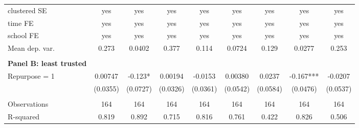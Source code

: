 \documentclass[12pt]{article}
\theoremstyle{plain}
\theoremstyle{plain}
\theoremstyle{plain}
\theoremstyle{definition}
\theoremstyle{plain}
\theoremstyle{definition}
\theoremstyle{plain}
\theoremstyle{remark}
\theoremstyle{definition}
\theoremstyle{definition}
\theoremstyle{plain}
\begin{document}
\begin{table}[H]
{\begin{tabular}{p{9.89em}llllllll}
	\multicolumn{1}{l}{clustered SE} & \multicolumn{1}{c}{yes} & \multicolumn{1}{c}{yes} & \multicolumn{1}{c}{yes} & \multicolumn{1}{c}{yes} & \multicolumn{1}{c}{yes} & \multicolumn{1}{c}{yes} & \multicolumn{1}{c}{yes} & \multicolumn{1}{c}{yes} \\
	\multicolumn{1}{l}{time FE} & \multicolumn{1}{c}{yes} & \multicolumn{1}{c}{yes} & \multicolumn{1}{c}{yes} & \multicolumn{1}{c}{yes} & \multicolumn{1}{c}{yes} & \multicolumn{1}{c}{yes} & \multicolumn{1}{c}{yes} & \multicolumn{1}{c}{yes} \\
	\multicolumn{1}{l}{school FE} & \multicolumn{1}{c}{yes} & \multicolumn{1}{c}{yes} & \multicolumn{1}{c}{yes} & \multicolumn{1}{c}{yes} & \multicolumn{1}{c}{yes} & \multicolumn{1}{c}{yes} & \multicolumn{1}{c}{yes} & \multicolumn{1}{c}{yes} \\
	\multicolumn{1}{l}{Mean dep. var.} & \multicolumn{1}{c}{0.273} & \multicolumn{1}{c}{0.0402} & \multicolumn{1}{c}{0.377} & \multicolumn{1}{c}{0.114} & \multicolumn{1}{c}{0.0724} & \multicolumn{1}{c}{0.129} & \multicolumn{1}{c}{0.0277} & \multicolumn{1}{c}{0.253} \\
	\midrule
	\multicolumn{1}{r}{} &       &       &       &       &       &       &       &  \\
	\multicolumn{1}{l}{\textbf{Panel B: least trusted}} &       &       &       &       &       &       &       &  \\
	\multicolumn{1}{l}{Repurpose = 1} & \multicolumn{1}{c}{0.00747} & \multicolumn{1}{c}{-0.123*} & \multicolumn{1}{c}{0.00194} & \multicolumn{1}{c}{-0.0153} & \multicolumn{1}{c}{0.00380} & \multicolumn{1}{c}{0.0237} & \multicolumn{1}{c}{-0.167***} & \multicolumn{1}{c}{-0.0207} \\
	\multicolumn{1}{l}{} & \multicolumn{1}{c}{(0.0355)} & \multicolumn{1}{c}{(0.0727)} & \multicolumn{1}{c}{(0.0326)} & \multicolumn{1}{c}{(0.0361)} & \multicolumn{1}{c}{(0.0542)} & \multicolumn{1}{c}{(0.0584)} & \multicolumn{1}{c}{(0.0476)} & \multicolumn{1}{c}{(0.0537)} \\
	\multicolumn{1}{r}{} &       &       &       &       &       &       &       &  \\
	\multicolumn{1}{l}{Observations} & \multicolumn{1}{c}{164} & \multicolumn{1}{c}{164} & \multicolumn{1}{c}{164} & \multicolumn{1}{c}{164} & \multicolumn{1}{c}{164} & \multicolumn{1}{c}{164} & \multicolumn{1}{c}{164} & \multicolumn{1}{c}{164} \\
	\multicolumn{1}{l}{R-squared} & \multicolumn{1}{c}{0.819} & \multicolumn{1}{c}{0.892} & \multicolumn{1}{c}{0.715} & \multicolumn{1}{c}{0.816} & \multicolumn{1}{c}{0.761} & \multicolumn{1}{c}{0.422} & \multicolumn{1}{c}{0.826} & \multicolumn{1}{c}{0.506} \\

\end{tabular}}
\end{table}
\end{document}
